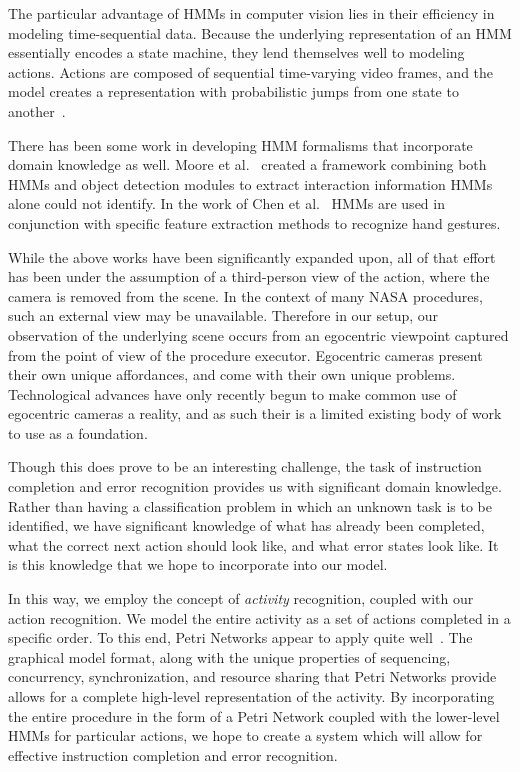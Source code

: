 \documentclass[10pt,twocolumn,letterpaper]{article}
\begin{document}
The particular advantage of HMMs in computer vision lies in their efficiency in modeling time-sequential data. Because the underlying representation of an HMM essentially encodes a state machine, they lend themselves well to modeling actions. Actions are composed of sequential time-varying video frames, and the model creates a representation with probabilistic jumps from one state to another~\cite{turaga2008machine}.

There has been some work in developing HMM formalisms that incorporate domain knowledge as well. Moore et al.~\cite{moore1999exploiting} created a framework combining both HMMs and object detection modules to extract interaction information HMMs alone could not identify. In the work of Chen et al.~\cite{chen2003hand} HMMs are used in conjunction with specific feature extraction methods to recognize hand gestures.

While the above works have been significantly expanded upon, all of that effort has been under the assumption of a third-person view of the action, where the camera is removed from the scene. In the context of many NASA procedures, such an external view may be unavailable. Therefore in our setup, our observation of the underlying scene occurs from an egocentric viewpoint captured from the point of view of the procedure executor. Egocentric cameras present their own unique affordances, and come with their own unique problems. Technological advances have only recently begun to make common use of egocentric cameras a reality, and as such their is a limited existing body of work to use as a foundation.

Though this does prove to be an interesting challenge, the task of instruction completion and error recognition provides us with significant domain knowledge. Rather than having a classification problem in which an unknown task is to be identified, we have significant knowledge of what has already been completed, what the correct next action should look like, and what error states look like. It is this knowledge that we hope to incorporate into our model.

In this way, we employ the concept of \emph{activity} recognition, coupled with our action recognition. We model the entire activity as a set of actions completed in a specific order. To this end, Petri Networks appear to apply quite well~\cite{petri1966communication}. The graphical model format, along with the unique properties of sequencing, concurrency, synchronization, and resource sharing that Petri Networks provide~\cite{david1994petri} allows for a complete high-level representation of the activity. By incorporating the entire procedure in the form of a Petri Network coupled with the lower-level HMMs for particular actions, we hope to create a system which will allow for effective instruction completion and error recognition.
\end{document}
